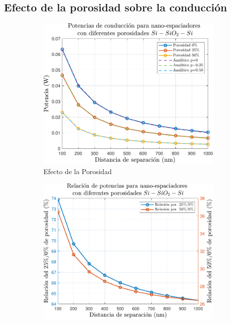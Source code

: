 \subsection{Efecto de la porosidad sobre la conducción}
\begin{figure}[H]
\centering
	\begin{subfigure}[b]{0.49\textwidth}
		\centering
		\includegraphics[width=1.0\textwidth]{figuras/Resultados/conduccion/pdf/Ppor_SiSiO2Si.pdf}
		\caption{Efecto de la Porosidad}
		\label{fig:Ppor_SiSiO2Si}
	\end{subfigure}
	\hfill
	\begin{subfigure}[b]{0.49\textwidth}
		\centering
		\includegraphics[width=1.0\textwidth]{figuras/Resultados/conduccion/pdf/relPpor_SiSiO2Si.pdf}

\end{subfigure}
\end{figure}
